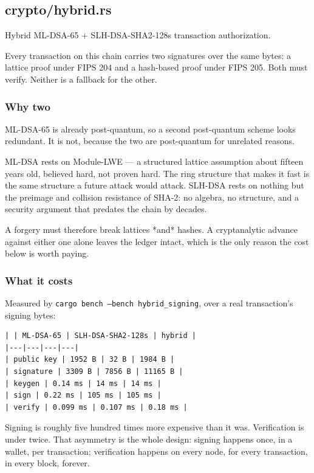 \documentclass[11pt,a4paper]{article}
\begin{document}
\subsection{crypto/hybrid.rs}
Hybrid ML-DSA-65 + SLH-DSA-SHA2-128s transaction authorization.

Every transaction on this chain carries two signatures over the same bytes:
a lattice proof under FIPS 204 and a hash-based proof under FIPS 205. Both
must verify. Neither is a fallback for the other.

\subsubsection{Why two}

ML-DSA-65 is already post-quantum, so a second post-quantum scheme looks
redundant. It is not, because the two are post-quantum for unrelated reasons.

ML-DSA rests on Module-LWE — a structured lattice assumption about fifteen
years old, believed hard, not proven hard. The ring structure that makes it
fast is the same structure a future attack would attack. SLH-DSA rests on
nothing but the preimage and collision resistance of SHA-2: no algebra, no
structure, and a security argument that predates the chain by decades.

A forgery must therefore break lattices *and* hashes. A cryptanalytic
advance against either one alone leaves the ledger intact, which is the only
reason the cost below is worth paying.

\subsubsection{What it costs}

Measured by \texttt{cargo bench --bench hybrid\_signing}, over a real transaction's
signing bytes:

\begin{verbatim}
| | ML-DSA-65 | SLH-DSA-SHA2-128s | hybrid |
|---|---|---|---|
| public key | 1952 B | 32 B | 1984 B |
| signature | 3309 B | 7856 B | 11165 B |
| keygen | 0.14 ms | 14 ms | 14 ms |
| sign | 0.22 ms | 105 ms | 105 ms |
| verify | 0.099 ms | 0.107 ms | 0.18 ms |
\end{verbatim}

Signing is roughly five hundred times more expensive than it was.
Verification is under twice. That asymmetry is the whole design: signing
happens once, in a wallet, per transaction; verification happens on every
node, for every transaction, in every block, forever.
\end{document}
